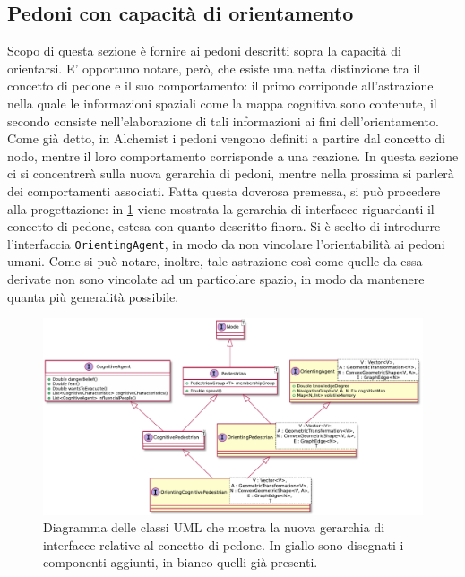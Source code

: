 \documentclass[12pt,a4paper,openright,oneside]{book}
\begin{document}
\subsection{Pedoni con capacità di orientamento}
Scopo di questa sezione è fornire ai pedoni descritti sopra la capacità di orientarsi. E' opportuno notare, però, che esiste una netta distinzione tra il concetto di pedone e il suo comportamento: il primo corriponde all'astrazione nella quale le informazioni spaziali come la mappa cognitiva sono contenute, il secondo consiste nell'elaborazione di tali informazioni ai fini dell'orientamento. Come già detto, in Alchemist i pedoni vengono definiti a partire dal concetto di nodo, mentre il loro comportamento corrisponde a una reazione. In questa sezione ci si concentrerà sulla nuova gerarchia di pedoni, mentre nella prossima si parlerà dei comportamenti associati. Fatta questa doverosa premessa, si può procedere alla progettazione: in \cref{fig:orienting-pedestrian-interfaces} viene mostrata la gerarchia di interfacce riguardanti il concetto di pedone, estesa con quanto descritto finora. Si è scelto di introdurre l'interfaccia \texttt{OrientingAgent}, in modo da non vincolare l'orientabilità ai pedoni umani. Come si può notare, inoltre, tale astrazione così come quelle da essa derivate non sono vincolate ad un particolare spazio, in modo da mantenere quanta più generalità possibile.
\begin{figure}
	\centering
	\includegraphics[width=\linewidth]{figures/orienting-pedestrian-interfaces.pdf}
	\caption{Diagramma delle classi UML che mostra la nuova gerarchia di interfacce relative al concetto di pedone. In giallo sono disegnati i componenti aggiunti, in bianco quelli già presenti.}
	\label{fig:orienting-pedestrian-interfaces}
\end{figure}
\end{document}
